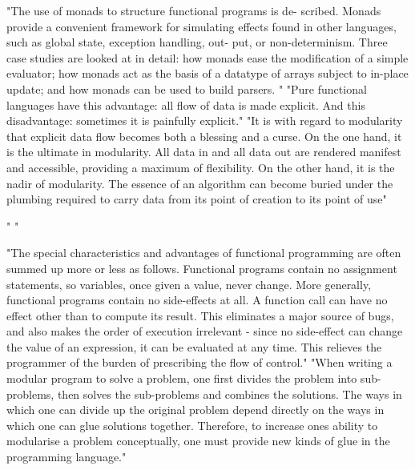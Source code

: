 "The use of monads to structure functional programs is de- scribed. Monads provide a convenient framework for simulating effects found in other languages, such as global state, exception handling, out- put, or non-determinism. Three case studies are looked at in detail: how monads ease the modification of a simple evaluator; how monads act as the basis of a datatype of arrays subject to in-place update; and how monads can be used to build parsers.
"
"Pure functional languages have this advantage: all flow of data is made explicit. And this disadvantage: sometimes it is painfully explicit."
"It is with regard to modularity that explicit data flow becomes both a blessing and a curse. On the one hand, it is the ultimate in modularity. All data in and all data out are rendered manifest and accessible, providing a maximum of flexibility. On the other hand, it is the nadir of modularity. The essence of an algorithm can become buried under the plumbing required to carry data from its point of creation to its point of use"
\cite{wadler1995monads}

"
"\cite{PeytonJones:1993}


"The special characteristics and advantages of functional programming are often summed up more or less as follows. Functional programs contain no assignment statements, so variables, once given a value, never change. More generally, functional programs contain no side-effects at all. A function call can have no effect other than to compute its result. This eliminates a major source of bugs, and also makes the order of execution irrelevant - since no side-effect can change the value of an expression, it can be evaluated at any time. This relieves the programmer of the burden of prescribing the flow of control."
"When writing a modular program to solve a problem, one first divides the problem into sub- problems, then solves the sub-problems and combines the solutions. The ways in which one can divide up the original problem depend directly on the ways in which one can glue solutions together. Therefore, to increase ones ability to modularise a problem conceptually, one must provide new kinds of glue in the programming language."
\cite{hughes1989functional}

